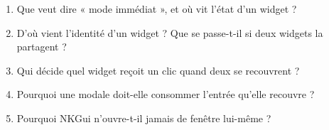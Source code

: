 \begin{nkquestions}
\begin{enumerate}
\item Que veut dire « mode immédiat », et où vit l'état d'un widget ?
\item D'où vient l'identité d'un widget ? Que se passe-t-il si deux widgets la
      partagent ?
\item Qui décide quel widget reçoit un clic quand deux se recouvrent ?
\item Pourquoi une modale doit-elle consommer l'entrée qu'elle recouvre ?
\item Pourquoi NKGui n'ouvre-t-il jamais de fenêtre lui-même ?
\end{enumerate}
\end{nkquestions}
